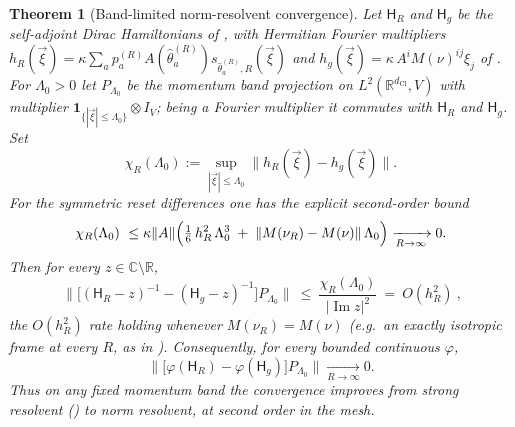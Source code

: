 \documentclass[11pt]{article}
\newtheorem{theorem}{Theorem}[section]
\theoremstyle{definition}
\theoremstyle{remark}
\newcommand{\R}{\mathbb{R}}
\newcommand{\C}{\mathbb{C}}
\newcommand{\dCl}{d_{\mathrm{Cl}}}
\newcommand{\Ham}{\mathsf{H}}
\newcommand{\norm}[1]{\lVert#1\rVert}
\begin{document}
\begin{theorem}[Band-limited norm-resolvent convergence]
\label{thm:band-norm-resolvent}
Let $\Ham_R$ and $\Ham_g$ be the self-adjoint Dirac Hamiltonians of
, with Hermitian Fourier multipliers
$h_R(\vec\xi)=\kappa\sum_a p_a^{(R)}A(\hat\theta_a^{(R)})s_{\hat\theta_a^{(R)},R}
(\vec\xi)$ and $h_g(\vec\xi)=\kappa\,A^iM(\nu)^{ij}\xi_j$ of
.  For $\Lambda_0>0$ let
$P_{\Lambda_0}$ be the momentum band projection on $L^2(\R^{\dCl},V)$ with multiplier
$\mathbf 1_{\{|\vec\xi|\le\Lambda_0\}}\otimes I_V$; being a Fourier multiplier it
commutes with $\Ham_R$ and $\Ham_g$.  Set
\[
  \chi_R(\Lambda_0):=\sup_{|\vec\xi|\le\Lambda_0}\bigl\lVert h_R(\vec\xi)
  -h_g(\vec\xi)\bigr\rVert .
\]
For the symmetric reset differences one has the explicit second-order bound
\[
  \chi_R(\Lambda_0)\ \le
  \kappa\norm{A}\Bigl(\tfrac16\,h_R^{2}\,\Lambda_0^{3}
  \;+\;\norm{M(\nu_R)-M(\nu)}\,\Lambda_0\Bigr)
  \xrightarrow[R\to\infty]{}0 .
\]
Then for every $z\in\C\setminus\R$,
\[
  \boxed{\ \bigl\lVert\bigl[(\Ham_R-z)^{-1}-(\Ham_g-z)^{-1}\bigr]
  P_{\Lambda_0}\bigr\rVert\ \le\ \frac{\chi_R(\Lambda_0)}{|\operatorname{Im}z|^{2}}
  \ =\ O(h_R^{2})\ } ,
\]
the $O(h_R^2)$ rate holding whenever $M(\nu_R)=M(\nu)$ \textup{(}e.g.\ an exactly
isotropic frame at every $R$, as in \textup{)}.  Consequently,
for every bounded continuous $\varphi$,
\[
  \bigl\lVert\bigl[\varphi(\Ham_R)-\varphi(\Ham_g)\bigr]P_{\Lambda_0}
  \bigr\rVert\xrightarrow[R\to\infty]{}0 .
\]
Thus on any fixed momentum band the convergence improves from strong resolvent
\textup{(}\textup{)} to \emph{norm} resolvent, at
second order in the mesh.
\end{theorem}
\end{document}
